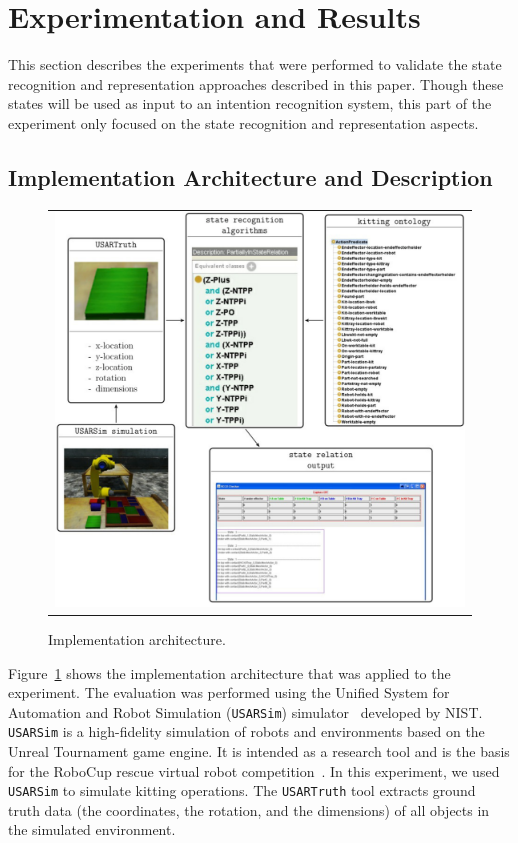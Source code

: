 \documentclass[preprint,12pt]{elsarticle}
\begin{document}
\section{Experimentation and Results}\label{S:section5}

This section describes the experiments that were performed to validate the state recognition and representation approaches described in this paper. Though these states will be used as input to an intention recognition system, this part of the experiment only focused on the state recognition and representation aspects.

\subsection{Implementation Architecture and Description}

\begin{figure}[t!h!]
\begin{tabular}{c}
\includegraphics[width=13cm]{architecture.pdf}
\end{tabular}
\caption{Implementation architecture.}
\label{fig:architecture}
\end{figure}
Figure~\ref{fig:architecture} shows the implementation architecture that was applied to the experiment. The evaluation was performed using the Unified System for Automation and Robot Simulation (\texttt{USARSim}) simulator~\cite{Carpin.ICRA.2007} developed by NIST. \texttt{USARSim} is a high-fidelity simulation of robots and environments based on the Unreal Tournament game engine. It is intended as a research tool and is the basis for the RoboCup rescue virtual robot competition~\cite{Kitano.ICAA.1997}. In this experiment, we used \texttt{USARSim} to simulate kitting operations. The \texttt{USARTruth} tool extracts ground truth data (the coordinates, the rotation, and the dimensions) of all objects in the simulated environment.
\end{document}
